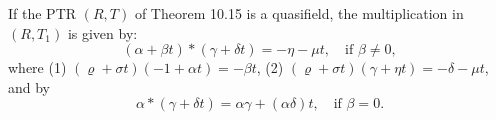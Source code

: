 If the PTR $(R,T)$ of Theorem 10.15 is a quasifield, the multiplication in $(R,T_1)$ is given by:
$$(\alpha + \beta t) * (\gamma + \delta t) = -\eta - \mu t, \quad \text{if } \beta \neq 0,$$
where
(1) $(\varrho + \sigma t)(-1 + \alpha t) = -\beta t$,
(2) $(\varrho + \sigma t)(\gamma + \eta t) = -\delta - \mu t$,
and by
$$\alpha * (\gamma + \delta t) = \alpha \gamma + (\alpha \delta) t, \quad \text{if } \beta = 0.$$
